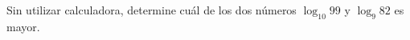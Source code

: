 \item Sin utilizar calculadora, determine cuál de los dos números $\log_{10} 99$ y $\log_9 82$ es mayor.
